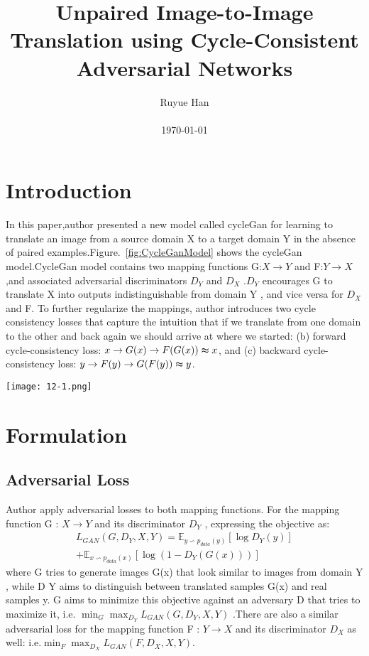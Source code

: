 \documentclass[10pt,twocolumn,letterpaper]{article}
\begin{document}
\title{Unpaired Image-to-Image Translation using Cycle-Consistent Adversarial Networks}

\author{Ruyue Han\\\\ \today}

\maketitle

\section{Introduction}
In this paper,author presented a new model called cycleGan for learning to translate an image from a source domain X to a target domain Y in the absence of paired examples.Figure.~\ref{fig:CycleGanModel} shows the cycleGan model.CycleGan model contains two mapping functions G:$X\to Y$ and F:$Y\to X$,and associated adversarial discriminators $D_{Y}$ and $D_{X}$ .$D_{Y}$ encourages G to translate X into outputs indistinguishable from domain Y , and vice versa for $D_{X}$ and F. To further regularize the mappings, author introduces two cycle consistency losses that capture the intuition that if we translate from one domain to the other and back again we should arrive at where we started: (b) forward cycle-consistency loss: $x\to G(x) \to F (G(x)) \thickapprox x$, and (c) backward cycle-consistency loss: $y \to F (y) \to G(F (y)) \thickapprox y$.
\begin{figure*}[htb]
\centering
\texttt{[image: 12-1.png]}
\caption{CycleGan model}
\label{fig:CycleGanModel}
\end{figure*}

\section{Formulation}
\subsection{Adversarial Loss}
Author apply adversarial losses to both mapping functions. For the mapping function G : $X\to Y$ and its discriminator $D_{Y}$ , expressing the objective as:
\begin{equation}
\begin{aligned}
L_{GAN}(G,D_{Y},X,Y) = \mathbb{E}_{y \backsim p_{data}(y)} \left[\log{D_{Y}(y)}\right] \\
+ \mathbb{E}_{x \backsim p_{data}(x)}\left[\log{(1-D_{Y}(G(x)))} \right]
\end{aligned}
\end{equation}
where G tries to generate images G(x) that look similar to images from domain Y , while D Y aims to distinguish between translated samples G(x) and real samples y. G aims to minimize this objective against an adversary D that tries to maximize it, i.e. $\min_{G}\max_{D_{Y}}L_{GAN}(G,D_{Y},X,Y)$ .There are also a similar adversarial loss for the mapping function F : $Y\to X$ and its discriminator $D_{X}$ as well: i.e.$\min_{F}\max_{D_{X}}L_{GAN}(F,D_{X},X,Y)$.
\end{document}
